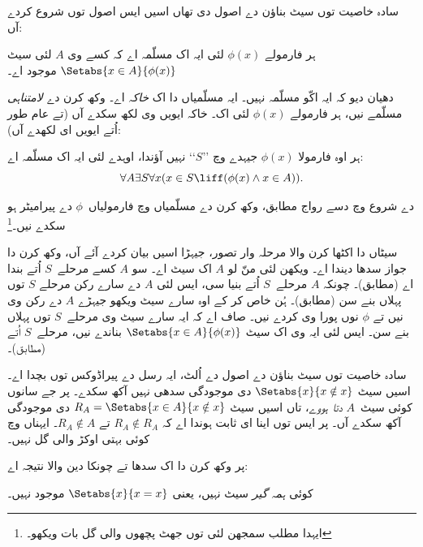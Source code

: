 \documentclass[../../../include/open-logic-section]{subfiles}
\begin{document}

سادہ خاصیت توں سیٹ بناؤن دے اصول دی تھاں اسیں ایس اصول توں شروع کردے آں:

\begin{axiom} ہر فارمولے $\phi(x)$ لئی ایہ اک مسلّمہ
اے کہ کسے وی $A$ لئی سیٹ $\Setabs{x \in A}{\phi(x)}$ موجود اے۔
\end{axiom}

دھیان دیو کہ ایہ اکّو مسلّمہ نہیں۔ ایہ مسلّمیاں دا اک \emph{خاکہ} اے۔
وکھ کرن دے \emph{لامتناہی} مسلّمے نیں، ہر فارمولے $\phi(x)$ لئی اک۔
خاکہ ایویں وی لکھ سکدے آں (تے عام طور اُتے ایویں ای لکھدے آں):

\begin{defish}
ہر اوہ فارمولا $\phi(x)$ جیہدے وچ ’’$S$‘‘ نہیں آؤندا، اوہدے لئی ایہ اک
مسلّمہ اے:
\[
	\forall A \exists S \forall x(x \in S \liff (\phi(x) \land x \in A)).
\]
\end{defish}

 دے شروع وچ دسے رواج مطابق، وکھ کرن دے مسلّمیاں
وچ فارمولیاں~$\phi$ دے پیرامیٹر ہو سکدے نیں۔\footnote{ایہدا مطلب
سمجھن لئی  توں
جھٹ پچھوں والی گل بات ویکھو۔}

سیٹاں دا اکٹھا کرن والا مرحلہ وار تصور، جیہڑا اسیں بیان کردے آئے آں،
وکھ کرن دا جواز سدھا دیندا اے۔ ویکھن لئی منّ لو $A$ اک سیٹ اے۔
سو $A$ کسے مرحلے~$S$ اُتے بندا اے (\stageshier مطابق)۔ چونکہ $A$
مرحلے~$S$ اُتے بنیا سی، ایس لئی $A$ دے سارے رکن مرحلے $S$ توں
پہلاں بنے سن (\stagesacc مطابق)۔ ہُن خاص کر کے اوہ سارے سیٹ ویکھو
جیہڑے $A$ دے رکن وی نیں تے $\phi$ نوں پورا وی کردے نیں۔ صاف اے
کہ ایہ سارے سیٹ وی مرحلے~$S$ توں پہلاں بنے سن۔ ایس لئی ایہ وی اک سیٹ
$\Setabs{x \in A}{\phi(x)}$ بناندے نیں، مرحلے~$S$ اُتے (\stagesacc مطابق)۔

سادہ خاصیت توں سیٹ بناؤن دے اصول دے اُلٹ، ایہ رسل دے پیراڈوکس توں
بچدا اے۔ اسیں سیٹ $\Setabs{x}{x \notin x}$ دی موجودگی سدھی نہیں آکھ
سکدے۔ پر جے سانوں کوئی سیٹ~$A$ \emph{دتا ہووے}، تاں اسیں سیٹ
$R_A = \Setabs{x \in A}{x \notin x}$ دی موجودگی آکھ سکدے آں۔ پر ایس توں
اینا ای ثابت ہوندا اے کہ $R_A \notin R_A$ تے $R_A \notin A$۔ ایہناں وچ
کوئی بہتی اوکڑ والی گل نہیں۔

پر وکھ کرن دا اک سدھا تے چونکا دین والا نتیجہ اے:

\begin{thm}
کوئی \emph{ہمہ گیر} سیٹ نہیں، یعنی $\Setabs{x}{x = x}$ موجود نہیں۔
\end{thm}
\end{document}

